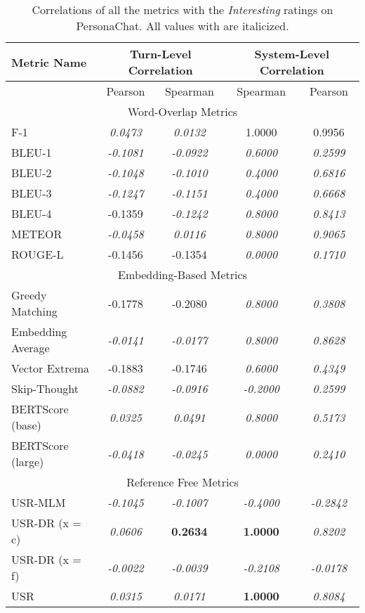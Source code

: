 \documentclass[11pt,a4paper]{article}
\begin{document}
\begin{table*}
    \centering
    \renewcommand*{\arraystretch}{1.2}
    \begin{tabular}{|l|c|c|c|c|}
    \hline
        \textbf{Metric Name} & \multicolumn{2}{|c|}{\textbf{Turn-Level Correlation}} & \multicolumn{2}{|c|}{\textbf{System-Level Correlation}}  \\ \hline
         & Pearson & Spearman & Spearman & Pearson \\ \hline
         \multicolumn{5}{|c|}{Word-Overlap Metrics} \\ \hline
F-1 & \textit{0.0473} & \textit{0.0132} & 1.0000 & 0.9956 \\
BLEU-1 & \textit{-0.1081} & \textit{-0.0922} & \textit{0.6000} & \textit{0.2599} \\
BLEU-2 & \textit{-0.1048} & \textit{-0.1010} & \textit{0.4000} & \textit{0.6816} \\
BLEU-3 & \textit{-0.1247} & \textit{-0.1151} & \textit{0.4000} & \textit{0.6668} \\
BLEU-4 & -0.1359 & \textit{-0.1242} & \textit{0.8000} & \textit{0.8413} \\
METEOR & \textit{-0.0458} & \textit{0.0116} & \textit{0.8000} & \textit{0.9065} \\
ROUGE-L & -0.1456 & -0.1354 & \textit{0.0000} & \textit{0.1710} \\\hline 
 \multicolumn{5}{|c|}{Embedding-Based Metrics} \\ \hline
Greedy Matching & -0.1778 & -0.2080 & \textit{0.8000} & \textit{0.3808} \\
Embedding Average & \textit{-0.0141} & \textit{-0.0177} & \textit{0.8000} & \textit{0.8628} \\
Vector Extrema & -0.1883 & -0.1746 & \textit{0.6000} & \textit{0.4349} \\
Skip-Thought & \textit{-0.0882} & \textit{-0.0916} & \textit{-0.2000} & \textit{0.2599} \\
BERTScore (base) & \textit{0.0325} & \textit{0.0491} & \textit{0.8000} & \textit{0.5173} \\
BERTScore (large) & \textit{-0.0418} & \textit{-0.0245} & \textit{0.0000} & \textit{0.2410} \\\hline 
 \multicolumn{5}{|c|}{Reference Free Metrics} \\ \hline
USR-MLM & \textit{-0.1045} & \textit{-0.1007} & \textit{-0.4000} & \textit{-0.2842} \\
USR-DR (x = c) & \textit{0.0606} & \textbf{0.2634} & \textbf{1.0000} & \textit{0.8202} \\
USR-DR (x = f) & \textit{-0.0022} & \textit{-0.0039} & \textit{-0.2108} & \textit{-0.0178} \\
USR & \textit{0.0315} & \textit{0.0171} & \textbf{1.0000} & \textit{0.8084} \\  \hline
    \end{tabular}
    \caption{Correlations of all the metrics with the \textit{Interesting} ratings on PersonaChat. All values with  are italicized.}
    
\end{table*}
\end{document}
